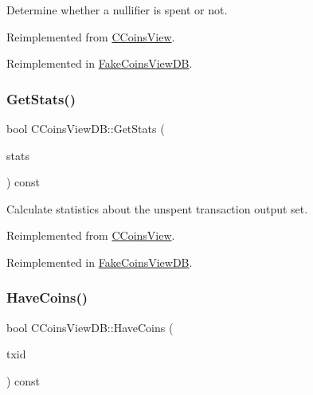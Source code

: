 Determine whether a nullifier is spent or not. 



Reimplemented from \mbox{\hyperlink{class_c_coins_view_a45a7abe02d0d9d1b61a09dec70a3311f}{C\+Coins\+View}}.



Reimplemented in \mbox{\hyperlink{class_fake_coins_view_d_b_af7d0ce4926fb03ee632148c5fde66c05}{Fake\+Coins\+View\+DB}}.

\mbox{\label{class_c_coins_view_d_b_a227bf56f8801921f12e56c6839104fce}} 
\subsubsection{\texorpdfstring{Get\+Stats()}{GetStats()}}
{\footnotesize\ttfamily bool C\+Coins\+View\+D\+B\+::\+Get\+Stats (\begin{DoxyParamCaption}\item[{\mbox{\hyperlink{struct_c_coins_stats}{C\+Coins\+Stats}} \&}]{stats }\end{DoxyParamCaption}) const\hspace{0.3cm}{\ttfamily [virtual]}}



Calculate statistics about the unspent transaction output set. 



Reimplemented from \mbox{\hyperlink{class_c_coins_view_adbd7f73ba071c6e441dd88d95b8f2c0d}{C\+Coins\+View}}.



Reimplemented in \mbox{\hyperlink{class_fake_coins_view_d_b_ad1deefbe955925e274e5d50d289275e9}{Fake\+Coins\+View\+DB}}.

\mbox{\label{class_c_coins_view_d_b_af55f35faadeb74b5406559fe3ed20114}} 
\subsubsection{\texorpdfstring{Have\+Coins()}{HaveCoins()}}
{\footnotesize\ttfamily bool C\+Coins\+View\+D\+B\+::\+Have\+Coins (\begin{DoxyParamCaption}\item[{const \mbox{\hyperlink{classuint256}{uint256}} \&}]{txid }\end{DoxyParamCaption}) const\hspace{0.3cm}{\ttfamily [virtual]}}

